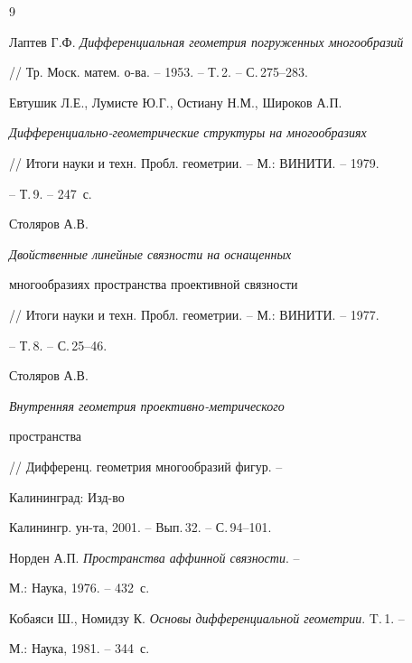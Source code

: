  


 


 


\begin{thebibliography}{9} 


 




Лаптев Г.Ф. {\em Дифференциальная геометрия погруженных многообразий} 


// Тр. Моск. матем. о-ва. -- 1953. -- Т.\,2. -- С.\,275--283. 




Евтушик Л.Е., Лумисте Ю.Г., Остиану Н.М., Широков А.П. 


{\em Дифференциально-гео\-мет\-ри\-чес\-кие структуры на многообразиях} 


// Итоги науки и техн. Пробл. геометрии. -- М.: ВИНИТИ. -- 1979. 


-- Т.\,9. -- 247~с. 




Столяров А.В. {\em Двойственные линейные связности на оснащенных 


многообразиях пространства проективной связности} 


// Итоги науки и техн. Пробл. геометрии. -- М.: ВИНИТИ. -- 1977. 


-- Т.\,8. -- С.\,25--46. 




Столяров А.В. {\em Внутренняя геометрия проективно-метрического 


пространства} // Дифференц. геометрия многообразий фигур. -- 


Калининград: Изд-во 


Калинингр. ун-та, 2001. -- Вып.\,32. -- С.\,94--101. 




Норден А.П. {\em Пространства аффинной связности}. -- 


М.: Наука, 1976. -- 432~с. 




Кобаяси Ш., Номидзу К. {\em Основы дифференциальной геометрии}. T.\,1. -- 


М.: Наука, 1981. -- 344~с. 


 


\end{thebibliography} 


 


\vskip 2cm 


 






 


\label{end} 


 


